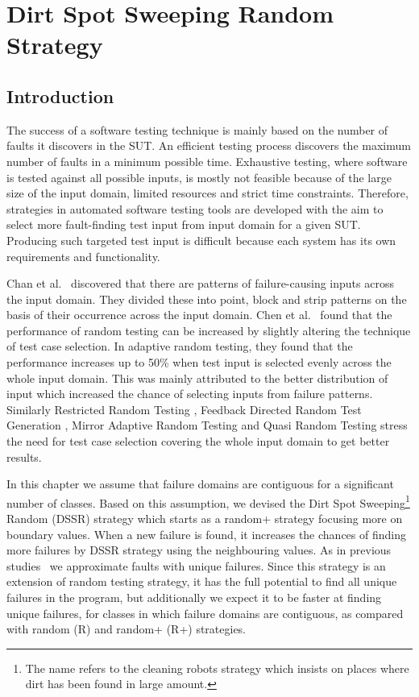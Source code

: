 
\chapter{Dirt Spot Sweeping Random Strategy}
\label{chap:DSSR}


\section{Introduction}\label{sec:intro4}
The success of a software testing technique is mainly based on the number of faults it discovers in the SUT. An efficient testing process discovers the maximum number of faults in a minimum possible time. Exhaustive testing, where software is tested against all possible inputs, is mostly not feasible because of the large size of the input domain, limited resources and strict time constraints. Therefore, strategies in automated software testing tools are developed with the aim to select more fault-finding test input from input domain for a given SUT. Producing such targeted test input is difficult because each system has its own requirements and functionality.

Chan et al.~\cite{chan1996proportional} discovered that there are patterns of failure-causing inputs across the input domain. They divided these into point, block and strip patterns on the basis of their occurrence across the input domain. Chen et al.~\cite{chen2005adaptive} found that the performance of random testing can be increased by slightly altering the technique of test case selection. In adaptive random testing, they found that the performance increases up to 50\% when test input is selected evenly across the whole input domain. This was mainly attributed to the better distribution of input which increased the chance of selecting inputs from failure patterns. Similarly Restricted Random Testing \cite{chan2003normalized}, Feedback Directed Random Test Generation \cite{pacheco2007randoop}, Mirror Adaptive Random Testing \cite{chen2004mirror} and Quasi Random Testing \cite{chen2007quasi} stress the need for test case selection covering the whole input domain to get better results.

In this chapter we assume that failure domains are contiguous for a significant number of classes. Based on this assumption, we devised the Dirt Spot Sweeping\footnote{The name refers to the cleaning robots strategy which insists on places where dirt has been found in large amount.} Random (DSSR) strategy  which starts as a random+ strategy focusing more on boundary values. When a new failure is found, it increases the chances of finding more failures by DSSR strategy using the neighbouring values. As in previous studies~\cite{oriol2012law} we approximate faults with unique failures. Since this strategy is an extension of random testing strategy, it has the full potential to find all unique failures in the program, but additionally we expect it to be faster at finding unique failures, for classes in which failure domains are contiguous, as compared with random (R) and random+ (R+) strategies.

